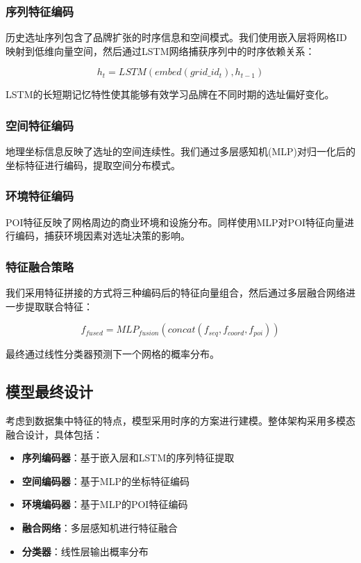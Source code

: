 \documentclass{article}
\begin{document}
\subsubsection{序列特征编码}
历史选址序列包含了品牌扩张的时序信息和空间模式。我们使用嵌入层将网格ID映射到低维向量空间，然后通过LSTM网络捕获序列中的时序依赖关系：

\begin{equation}
h_t = LSTM(embed(grid\_id_t), h_{t-1})
\end{equation}

LSTM的长短期记忆特性使其能够有效学习品牌在不同时期的选址偏好变化。

\subsubsection{空间特征编码}
地理坐标信息反映了选址的空间连续性。我们通过多层感知机(MLP)对归一化后的坐标特征进行编码，提取空间分布模式。

\subsubsection{环境特征编码}
POI特征反映了网格周边的商业环境和设施分布。同样使用MLP对POI特征向量进行编码，捕获环境因素对选址决策的影响。

\subsubsection{特征融合策略}
我们采用特征拼接的方式将三种编码后的特征向量组合，然后通过多层融合网络进一步提取联合特征：

\begin{equation}
f_{fused} = MLP_{fusion}(concat(f_{seq}, f_{coord}, f_{poi}))
\end{equation}

最终通过线性分类器预测下一个网格的概率分布。

\subsection{模型最终设计}

考虑到数据集中特征的特点，模型采用时序的方案进行建模。整体架构采用多模态融合设计，具体包括：

\begin{itemize}
\item \textbf{序列编码器}：基于嵌入层和LSTM的序列特征提取
\item \textbf{空间编码器}：基于MLP的坐标特征编码
\item \textbf{环境编码器}：基于MLP的POI特征编码  
\item \textbf{融合网络}：多层感知机进行特征融合
\item \textbf{分类器}：线性层输出概率分布
\end{itemize}
\end{document}
